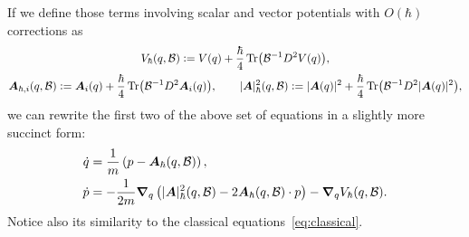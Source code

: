 \documentclass[10pt]{article}
\def\defeq{\mathrel{\mathop:}=}
\newcommand{\vect}[1]{\boldsymbol{#1}}
\begin{document}
If we define those terms involving scalar and vector potentials with $O(\hbar)$ corrections as
\begin{gather*}
  V_{\hbar}(q, \mathcal{B}) \defeq V(q) + \frac{\hbar}{4} \Tr(\mathcal{B}^{-1} D^2 V(q) ), \\
  \vect{A}_{\hbar,i}(q, \mathcal{B}) \defeq \vect{A}_i(q) + \frac{\hbar}{4} \Tr(\mathcal{B}^{-1} D^2 \vect{A}_i(q) ),
  \qquad
  |\vect{A}|^{2}_{\hbar}(q, \mathcal{B}) \defeq |\vect{A}(q)|^{2} + \frac{\hbar}{4} \Tr(\mathcal{B}^{-1} D^2 |\vect{A}(q)|^{2} ),
\end{gather*}
we can rewrite the first two of the above set of equations in a slightly more succinct form:
\begin{align*}
  \dot{q} &= \frac{1}{m}\left( p - \vect{A}_{\hbar}(q,\mathcal{B}) \right),\\
  \dot{p} &= -\frac{1}{2m}\grad_{q} \left(
            |\vect{A}|^{2}_{\hbar}(q, \mathcal{B}) - 2 \vect{A}_{\hbar}(q, \mathcal{B}) \cdot p
            \right) - \grad_{q} V_{\hbar}(q, \mathcal{B}).
\end{align*}
Notice also its similarity to the classical equations~\eqref{eq:classical}.
\end{document}
